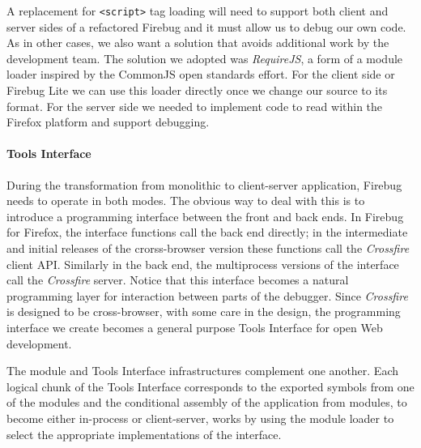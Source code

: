 A replacement for  \texttt{<script>} tag loading will need to support both client and server sides of a refactored Firebug and it must allow us to debug our own code.  As in other cases, we also want a solution that avoids additional work by the development team. The solution we adopted was \textit{RequireJS}\cite{requirejs}, a form of a module loader inspired by the CommonJS\cite{commonjs} open standards effort.  For the client side or Firebug Lite we can use this loader directly once we change our source to its format. For the server side we needed to implement code to read within the Firefox platform and support debugging. 

\paragraph{Tools Interface}
During the transformation from monolithic to client-server application, Firebug needs to operate in both modes. The obvious way to deal with this is to introduce a programming interface between the front and back ends. In Firebug for Firefox, the interface functions call the back end directly; in the intermediate and initial releases of the crorss-browser version these functions call the \textit{Crossfire} client API.  Similarly in the back end, the multiprocess versions of the interface call the \textit{Crossfire} server.  Notice that this interface becomes a natural programming layer for interaction between parts of the debugger. 
Since \textit{Crossfire} is designed to be cross-browser, with some care in the design, the programming interface we create becomes a general purpose Tools Interface for open Web development.

The module and Tools Interface infrastructures complement one another. Each logical chunk of the Tools Interface corresponds to the exported symbols from one of the modules and the conditional assembly of the application from modules, to become either in-process or client-server, works by using the module loader to select the appropriate implementations of the interface.

